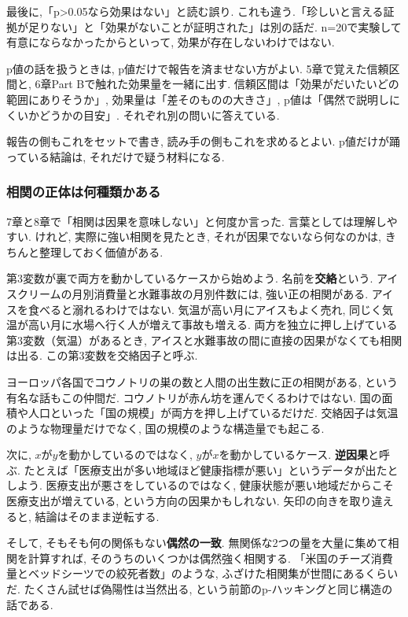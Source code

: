 最後に,「p>0.05なら効果はない」と読む誤り.
これも違う.「珍しいと言える証拠が足りない」と「効果がないことが証明された」は別の話だ.
n=20で実験して有意にならなかったからといって, 効果が存在しないわけではない.

p値の話を扱うときは, p値だけで報告を済ませない方がよい.
5章で覚えた信頼区間と, 6章Part Bで触れた効果量を一緒に出す.
信頼区間は「効果がだいたいどの範囲にありそうか」, 効果量は「差そのものの大きさ」, p値は「偶然で説明しにくいかどうかの目安」.
それぞれ別の問いに答えている.

報告の側もこれをセットで書き, 読み手の側もこれを求めるとよい.
p値だけが踊っている結論は, それだけで疑う材料になる.

\subsubsection*{相関の正体は何種類かある}

7章と8章で「相関は因果を意味しない」と何度か言った.
言葉としては理解しやすい. けれど, 実際に強い相関を見たとき, それが因果でないなら何なのかは, きちんと整理しておく価値がある.

第3変数が裏で両方を動かしているケースから始めよう. 名前を\textbf{交絡}という.
アイスクリームの月別消費量と水難事故の月別件数には, 強い正の相関がある.
アイスを食べると溺れるわけではない. 気温が高い月にアイスもよく売れ, 同じく気温が高い月に水場へ行く人が増えて事故も増える.
両方を独立に押し上げている第3変数（気温）があるとき, アイスと水難事故の間に直接の因果がなくても相関は出る.
この第3変数を交絡因子と呼ぶ.

ヨーロッパ各国でコウノトリの巣の数と人間の出生数に正の相関がある, という有名な話もこの仲間だ.
コウノトリが赤ん坊を運んでくるわけではない. 国の面積や人口といった「国の規模」が両方を押し上げているだけだ.
交絡因子は気温のような物理量だけでなく, 国の規模のような構造量でも起こる.

次に, $x$が$y$を動かしているのではなく, $y$が$x$を動かしているケース. \textbf{逆因果}と呼ぶ.
たとえば「医療支出が多い地域ほど健康指標が悪い」というデータが出たとしよう.
医療支出が悪さをしているのではなく, 健康状態が悪い地域だからこそ医療支出が増えている, という方向の因果かもしれない.
矢印の向きを取り違えると, 結論はそのまま逆転する.

そして, そもそも何の関係もない\textbf{偶然の一致}.
無関係な2つの量を大量に集めて相関を計算すれば, そのうちのいくつかは偶然強く相関する.
「米国のチーズ消費量とベッドシーツでの絞死者数」のような, ふざけた相関集が世間にあるくらいだ.
たくさん試せば偽陽性は当然出る, という前節のp-ハッキングと同じ構造の話である.

